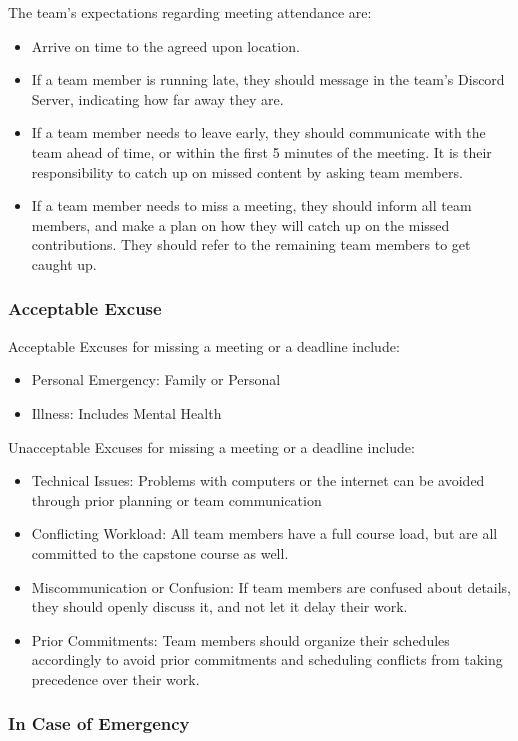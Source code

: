 \documentclass{article}
\begin{document}
\indent The team's expectations regarding meeting attendance are:
\begin{itemize}
  \item Arrive on time to the agreed upon location.
  \item If a team member is running late, they should message in the team's Discord Server, indicating how far away they are.
  \item If a team member needs to leave early, they should communicate with the team ahead of time, or within the first 5 minutes of the meeting. It is their responsibility to catch up on missed content by asking team members.
  \item If a team member needs to miss a meeting, they should inform all team members, and make a plan on how they will catch up on the missed contributions. They should refer to the remaining team members to get caught up.
\end{itemize}

\subsubsection*{Acceptable Excuse}

Acceptable Excuses for missing a meeting or a deadline include:
\begin{itemize}
  \item Personal Emergency: Family or Personal
  \item Illness: Includes Mental Health
\end{itemize}

Unacceptable Excuses for missing a meeting or a deadline include:
\begin{itemize}
  \item Technical Issues: Problems with computers or the internet can be avoided through prior planning or team communication
  \item Conflicting Workload: All team members have a full course load, but are all committed to the capstone course as well.
  \item Miscommunication or Confusion: If team members are confused about details, they should openly discuss it, and not let it delay their work.
  \item Prior Commitments: Team members should organize their schedules accordingly to avoid prior commitments and scheduling conflicts from taking precedence over their work.
\end{itemize}

\subsubsection*{In Case of Emergency}
\end{document}
